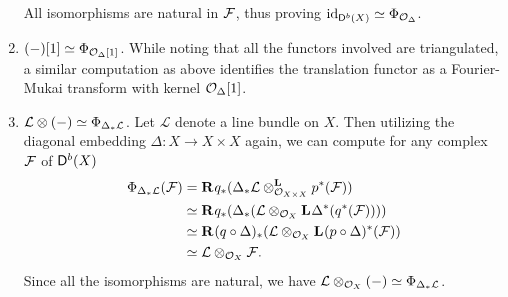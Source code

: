 \begin{example}
\begin{enumerate}[label = (\roman*)]
{    %
    All isomorphisms are natural in $\F$, thus proving $\id{\derb{X}} \iso \fm{\struct{\Delta}}$.
    }
    \item{$(-)[1] \iso \fm{\struct{\Delta}[1]}$. While noting that all the functors involved are triangulated, a similar computation as above identifies the translation functor as a Fourier-Mukai transform with kernel $\struct{\Delta}[1]$.} \label{shift is FM}
    \item{
    $\mathcal L \otimes (-) \iso \fm{\Delta_*\mathcal L}$. Let $\mathcal L$ denote a line bundle on $X$. Then utilizing the diagonal embedding $\Delta \colon X \to X \times X$ again, we can compute for any complex $\F$ of $\derb{X}$
    \begin{align*}
        \fm{{\Delta_*\mathcal L}}(\F) &= \rderived{}{q_*}(\derivedtensor{\Delta_*\mathcal L}{p^*(\F)}{\struct{X \times X}}) \\
        &\iso \rderived{}{q_*}(\Delta_*(\mathcal L \otimes_{\struct{X}}\lderived{}{\Delta^*}({q^*}(\F)))) \\
        &\iso \rderived{}{(q \circ \Delta)_*}(\mathcal L \otimes_{\struct{X}} \lderived{}{(p \circ \Delta)^*}(\F)) \\
        &\iso \mathcal L \otimes_{\struct{X}} \F.
    \end{align*}
    Since all the isomorphisms are natural, we have $\mathcal L \otimes_{\struct{X}} (-) \iso \fm{\Delta_*\mathcal L}$.
}
\end{enumerate}
\end{example}
